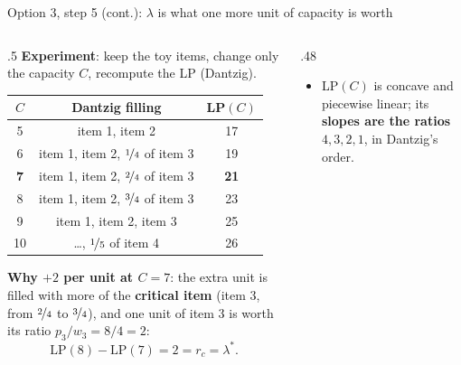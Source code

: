 \documentclass[aspectratio=169,11pt]{beamer}
\begin{document}
\begin{frame}{Option 3, step 5 (cont.): $\lambda$ is what one more unit of capacity is worth}
\scriptsize
\begin{columns}[T]
\begin{column}{.5\textwidth}
\textbf{Experiment}: keep the toy items, change only the capacity $C$, recompute the LP (Dantzig).
\begin{center}
\begin{tabular}{ccc}\toprule
$C$ & Dantzig filling & LP$(C)$\\\midrule
5 & item 1, item 2 & 17\\
6 & item 1, item 2, $\nicefrac14$ of item 3 & 19\\
\textbf{7} & item 1, item 2, $\nicefrac24$ of item 3 & \textbf{21}\\
8 & item 1, item 2, $\nicefrac34$ of item 3 & 23\\
9 & item 1, item 2, item 3 & 25\\
10 & \dots, $\nicefrac15$ of item 4 & 26\\\bottomrule
\end{tabular}
\end{center}
\textbf{Why $+2$ per unit at $C = 7$}: the extra unit is filled with more of the \textbf{critical item} (item 3, from
$\nicefrac24$ to $\nicefrac34$), and one unit of item 3 is worth its ratio $p_3/w_3 = 8/4 = 2$:
\[
\text{LP}(8) - \text{LP}(7) = 2 = r_c = \lambda^{*}.
\]
\end{column}
\begin{column}{.48\textwidth}
\centering
{}
\begin{itemize}\setlength\itemsep{1pt}
\item LP$(C)$ is concave and piecewise linear; its \textbf{slopes are the ratios} $4, 3, 2, 1$, in Dantzig's order.

\end{itemize}
\end{column}
\end{columns}
\end{frame}
\end{document}
